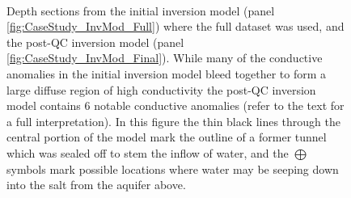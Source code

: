 \documentclass[final,authoryear,5p,times,twocolumn]{elsarticle}
\begin{document}
\begin{figure} [!ht]
    \begin{center}
     \\%
    \end{center}
\caption{Depth sections from the initial inversion model (panel \ref{fig:CaseStudy_InvMod_Full}) where the full dataset was used, and the  post-QC inversion model (panel \ref{fig:CaseStudy_InvMod_Final}). While many of the conductive anomalies in the initial inversion model bleed together to form a large diffuse region of high conductivity the post-QC inversion model contains 6 notable conductive anomalies (refer to the text for a full interpretation). In this figure the thin black lines through the central portion of the model mark the outline of a former tunnel which was sealed off to stem the inflow of water, and the $\bigoplus$ symbols mark possible locations where water may be seeping down into the salt from the aquifer above.}

\end{figure}
\end{document}
